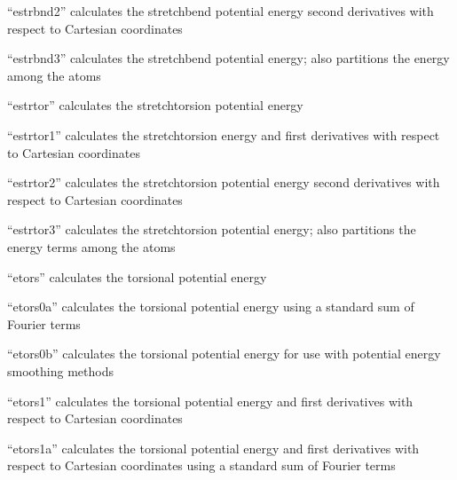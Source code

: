 \documentclass[letterpaper,11pt,english]{sphinxmanual}
\begin{document}

“estrbnd2” calculates the stretch\sphinxhyphen{}bend potential energy second derivatives with respect to Cartesian coordinates


“estrbnd3” calculates the stretch\sphinxhyphen{}bend potential energy; also partitions the energy among the atoms


“estrtor” calculates the stretch\sphinxhyphen{}torsion potential energy


“estrtor1” calculates the stretch\sphinxhyphen{}torsion energy and first derivatives with respect to Cartesian coordinates


“estrtor2” calculates the stretch\sphinxhyphen{}torsion potential energy second derivatives with respect to Cartesian coordinates


“estrtor3” calculates the stretch\sphinxhyphen{}torsion potential energy; also partitions the energy terms among the atoms


“etors” calculates the torsional potential energy


“etors0a” calculates the torsional potential energy using a standard sum of Fourier terms


“etors0b” calculates the torsional potential energy for use with potential energy smoothing methods


“etors1” calculates the torsional potential energy and first derivatives with respect to Cartesian coordinates


“etors1a” calculates the torsional potential energy and first derivatives with respect to Cartesian coordinates using a standard sum of Fourier terms

\end{document}
